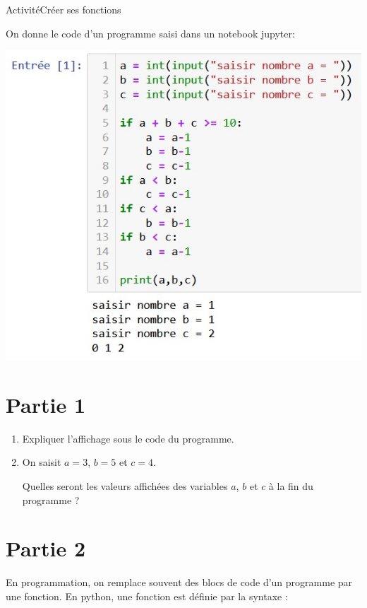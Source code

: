 \documentclass[12pt,a4paper]{article}
\begin{document}
\begin{NSI}
{Activité}{Créer ses fonctions}
\end{NSI}

On donne le code d'un programme saisi dans un notebook jupyter:

\begin{center}
\includegraphics[scale=0.75]{img/activite_1.jpg}
\end{center}

\section*{Partie 1}
\begin{enumerate}
\item Expliquer l'affichage sous le code du programme.
\item On saisit $a=3$, $b=5$ et $c=4$. 

Quelles seront les valeurs affichées des variables $a$, $b$ et $c$ à la fin du programme ?

\end{enumerate}

\section*{Partie 2}

En programmation, on remplace souvent des blocs de code d'un programme par une fonction. En python, une fonction est définie par la syntaxe :
\end{document}
